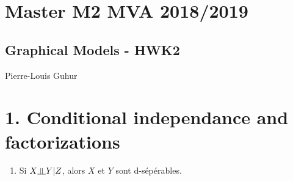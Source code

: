 \documentclass[a4paper]{article}
\begin{document}
\section{Master M2 MVA 2018/2019%
  \label{master-m2-mva-2018-2019}%
}


\subsection{Graphical Models - HWK2%
  \label{graphical-models-hwk2}%
}

Pierre-Louis Guhur


\section{1. Conditional independance and factorizations%
  \label{conditional-independance-and-factorizations}%
}

\begin{enumerate}
\item Si $X \indep Y | Z$, alors $X$ et $Y$ sont d-sépérables.
\end{enumerate}
\end{document}
